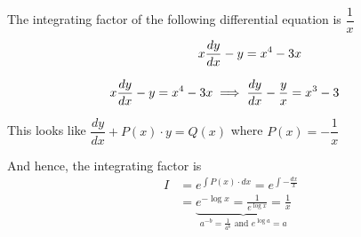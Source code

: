 \documentclass[14pt,fleqn]{extarticle}
\begin{document}
 
\begin{snippet}
    \correct
    
    The integrating factor of the following differential equation is $\dfrac{1}{x}$
    \[\qquad\quad x\frac{dy}{dx} - y = x^4 - 3x \]

    
    \reason
    
    \begin{align}
	x\frac{dy}{dx} - y &= x^4 - 3x \implies \frac{dy}{dx} - \frac{y}{x} = x^3 - 3 
\end{align}

This looks like $\dfrac{dy}{dx} +P(x)\cdot y = Q(x)$ where $P(x) = -\dfrac{1}{x}$ \newline 

And hence, the integrating factor is 
\begin{align}
I &= e^{\int P(x)\cdot dx} = e^{\int -\frac{dx}{x}} \\
&= \underbrace{e^{-\log x} = \frac{1}{e^{\log x}} = \frac{1}{x}}_{a^{-b} = \frac{1}{a^b}\text{ and } e^{\log a} = a}
\end{align}
    
\end{snippet} 
\end{document}
